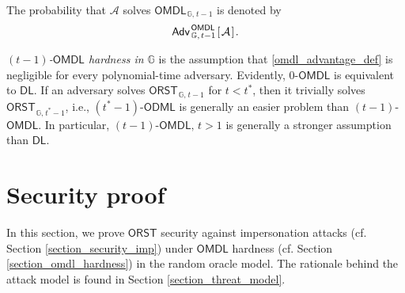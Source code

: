 \documentclass[10pt, psamsfonts, reqno]{amsart}
\theoremstyle{definition}
\theoremstyle{remark}
\numberwithin{equation}{section}
\begin{document}
\noindent
The probability that $\mathcal{A}$
solves $\mathsf{OMDL}_{\hspace{1pt}\mathbb{G},\hspace{1pt}t-1}$
is denoted by
\vspace{5pt}
\begin{equation}\label{omdl_advantage_def}
\mathsf{Adv}
	_{\hspace{1pt}\mathbb{G},\hspace{1pt} t-1}
	^{\hspace{1pt}\mathsf{OMDL}}
	\hspace{1pt}
		[\hspace{1pt}
			\mathcal{A}
		\hspace{1pt}]\hspace{1pt}.
\vspace{5pt}
\end{equation}

\noindent
\textit{$(t-1)$-$\mathsf{OMDL}$ hardness in $\mathbb{G}$}
is the assumption that \eqref{omdl_advantage_def}
is negligible for every polynomial-time adversary.
Evidently, $0$-$\mathsf{OMDL}$
is equivalent to $\mathsf{DL}$.
If an adversary solves
$\mathsf{ORST}_{\hspace{1pt}\mathbb{G},\hspace{1pt} t-1}$
for $t < t^*$,
then it trivially solves
$\mathsf{ORST}_{\hspace{1pt}\mathbb{G},\hspace{1pt} t^*-1}$,
i.e., $(t^*-1)$-$\mathsf{ODML}$ is generally
an easier problem than $(t-1)$-$\mathsf{OMDL}$.
In particular,
$(t-1)$-$\mathsf{OMDL},\hspace{2pt} t > 1$
is generally a stronger assumption than
$\mathsf{DL}$.

\section{Security proof}\label{section_security_proof}

\noindent
In this section,
we prove $\mathsf{ORST}$ security against
impersonation attacks (cf. Section \ref{section_security_imp})
under $\mathsf{OMDL}$ hardness
(cf. Section \ref{section_omdl_hardness})
in the random oracle model.
The rationale behind the attack model
is found in Section \ref{section_threat_model}.
\end{document}
